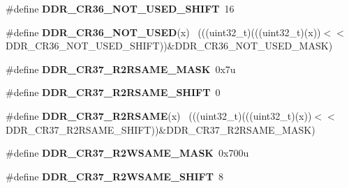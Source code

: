 \begin{DoxyCompactItemize}
\item 
\hypertarget{group___d_d_r___register___masks_gae20bce3fa90acadf850483e652142eab}{}\#define {\bfseries D\+D\+R\+\_\+\+C\+R36\+\_\+\+N\+O\+T\+\_\+\+U\+S\+E\+D\+\_\+\+S\+H\+I\+F\+T}~16\label{group___d_d_r___register___masks_gae20bce3fa90acadf850483e652142eab}

\item 
\hypertarget{group___d_d_r___register___masks_ga4ace70c72340eff6e2bed1aac615dc39}{}\#define {\bfseries D\+D\+R\+\_\+\+C\+R36\+\_\+\+N\+O\+T\+\_\+\+U\+S\+E\+D}(x)                                      ~(((uint32\+\_\+t)(((uint32\+\_\+t)(x))$<$$<$D\+D\+R\+\_\+\+C\+R36\+\_\+\+N\+O\+T\+\_\+\+U\+S\+E\+D\+\_\+\+S\+H\+I\+F\+T))\&D\+D\+R\+\_\+\+C\+R36\+\_\+\+N\+O\+T\+\_\+\+U\+S\+E\+D\+\_\+\+M\+A\+S\+K)\label{group___d_d_r___register___masks_ga4ace70c72340eff6e2bed1aac615dc39}

\item 
\hypertarget{group___d_d_r___register___masks_ga77bd4b9759d961a2c231ceaa8e067a61}{}\#define {\bfseries D\+D\+R\+\_\+\+C\+R37\+\_\+\+R2\+R\+S\+A\+M\+E\+\_\+\+M\+A\+S\+K}~0x7u\label{group___d_d_r___register___masks_ga77bd4b9759d961a2c231ceaa8e067a61}

\item 
\hypertarget{group___d_d_r___register___masks_gad0a43053c5c9f6427a80738752bc2d9a}{}\#define {\bfseries D\+D\+R\+\_\+\+C\+R37\+\_\+\+R2\+R\+S\+A\+M\+E\+\_\+\+S\+H\+I\+F\+T}~0\label{group___d_d_r___register___masks_gad0a43053c5c9f6427a80738752bc2d9a}

\item 
\hypertarget{group___d_d_r___register___masks_ga7dab4a1fe3b80c6012ccbdc2ba86951a}{}\#define {\bfseries D\+D\+R\+\_\+\+C\+R37\+\_\+\+R2\+R\+S\+A\+M\+E}(x)                                        ~(((uint32\+\_\+t)(((uint32\+\_\+t)(x))$<$$<$D\+D\+R\+\_\+\+C\+R37\+\_\+\+R2\+R\+S\+A\+M\+E\+\_\+\+S\+H\+I\+F\+T))\&D\+D\+R\+\_\+\+C\+R37\+\_\+\+R2\+R\+S\+A\+M\+E\+\_\+\+M\+A\+S\+K)\label{group___d_d_r___register___masks_ga7dab4a1fe3b80c6012ccbdc2ba86951a}

\item 
\hypertarget{group___d_d_r___register___masks_ga29534c3bdf76ca021cbb088bf518137d}{}\#define {\bfseries D\+D\+R\+\_\+\+C\+R37\+\_\+\+R2\+W\+S\+A\+M\+E\+\_\+\+M\+A\+S\+K}~0x700u\label{group___d_d_r___register___masks_ga29534c3bdf76ca021cbb088bf518137d}

\item 
\hypertarget{group___d_d_r___register___masks_ga4c46b2dd81e2be0bf53279cfe0c1ac85}{}\#define {\bfseries D\+D\+R\+\_\+\+C\+R37\+\_\+\+R2\+W\+S\+A\+M\+E\+\_\+\+S\+H\+I\+F\+T}~8\label{group___d_d_r___register___masks_ga4c46b2dd81e2be0bf53279cfe0c1ac85}


\end{DoxyCompactItemize}
